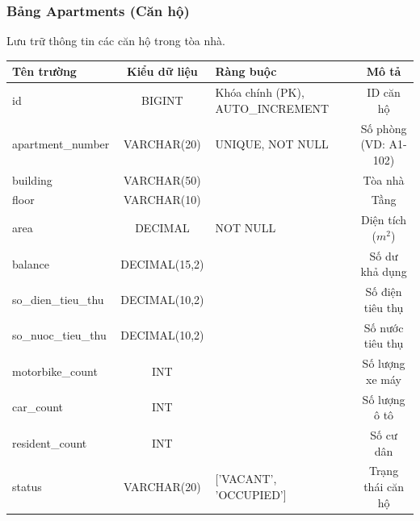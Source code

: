 \documentclass[12pt,a4paper]{article}
\begin{document}
\subsubsection{Bảng Apartments (Căn hộ)}
Lưu trữ thông tin các căn hộ trong tòa nhà.
\begin{table}[H]
    \centering
    \begin{tabularx}{\textwidth}{|L{3cm}|c|X|c|}
    \hline
    \textbf{Tên trường} & \textbf{Kiểu dữ liệu} & \textbf{Ràng buộc} & \textbf{Mô tả} \\
    \hline
    id & BIGINT & Khóa chính (PK), AUTO\_INCREMENT & ID căn hộ \\
    \hline
    apartment\_number & VARCHAR(20) & UNIQUE, NOT NULL & Số phòng (VD: A1-102) \\
    \hline
    building & VARCHAR(50) & & Tòa nhà \\
    \hline
    floor & VARCHAR(10) & & Tầng \\
    \hline
    area & DECIMAL & NOT NULL & Diện tích ($m^2$) \\
    \hline
    balance & DECIMAL(15,2) & & Số dư khả dụng \\
    \hline
    so\_dien\_tieu\_thu & DECIMAL(10,2) & & Số điện tiêu thụ \\
    \hline
    so\_nuoc\_tieu\_thu & DECIMAL(10,2) & & Số nước tiêu thụ \\
    \hline
    motorbike\_count & INT & & Số lượng xe máy \\
    \hline
    car\_count & INT & & Số lượng ô tô \\
    \hline
    resident\_count & INT & & Số cư dân \\
    \hline
    status & VARCHAR(20) & ['VACANT', 'OCCUPIED'] & Trạng thái căn hộ \\
    \hline
    \end{tabularx}
\end{table}
\end{document}
